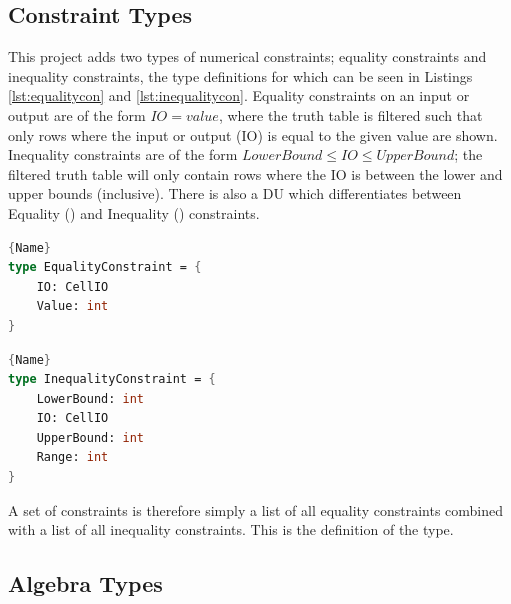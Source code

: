\subsection{Constraint Types}
This project adds two types of numerical constraints; equality constraints and inequality constraints, the type definitions for which can be seen in Listings \ref{lst:equalitycon} and \ref{lst:inequalitycon}. Equality constraints on an input or output are of the form $IO = value$, where the truth table is filtered such that only rows where the input or output (IO) is equal to the given value are shown. Inequality constraints are of the form $LowerBound \leq IO \leq UpperBound$; the filtered truth table will only contain rows where the IO is between the lower and upper bounds (inclusive). There is also a  DU which differentiates between Equality () and Inequality () constraints.

\begin{center}
\noindent\begin{minipage}{.45\textwidth}
\begin{lstlisting}[caption=Definition for Equality Constraint,frame=tlrb, language=FSharp, label=lst:equalitycon]{Name}
type EqualityConstraint = {
    IO: CellIO
    Value: int
}
\end{lstlisting}
\end{minipage}\hfill
\begin{minipage}{.45\textwidth}
\begin{lstlisting}[caption=Definition for Inequality Constraint,frame=tlrb, language=FSharp, label=lst:inequalitycon]{Name}
type InequalityConstraint = {
    LowerBound: int
    IO: CellIO
    UpperBound: int
    Range: int
}
\end{lstlisting} 
\end{minipage}
\end{center}

A set of constraints is therefore simply a list of all equality constraints combined with a list of all inequality constraints. This is the definition of the  type.

\subsection{Algebra Types} \label{sec:algebra_types}
